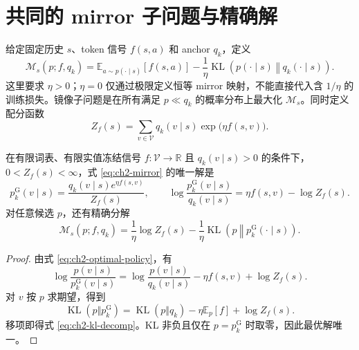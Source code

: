 \section{共同的 mirror 子问题与精确解}
\label{sec:ch2-common}

\begin{definition}
\label{def:ch2-mirror-subproblem}
给定固定历史 $s$、token 信号 $f(s,a)$ 和 anchor $ q_k$，定义
\begin{equation}
\label{eq:ch2-mirror}
\mathcal M_s(p;f, q_k)
=\mathbb E_{a\sim p(\cdot\mid s)}[f(s,a)]
-\frac1\eta\operatorname{KL}\!\left(p(\cdot\mid s)\middle\Vert q_k(\cdot\mid s)\right).
\end{equation}
这里要求 $\eta>0$；$\eta=0$ 仅通过极限定义恒等 mirror 映射，不能直接代入含 $1/\eta$ 的训练损失。镜像子问题是在所有满足 $p\ll q_k$ 的概率分布上最大化 $\mathcal M_s$。同时定义配分函数
\begin{equation}
\label{eq:ch2-mirror-normalizer}
Z_f(s)=\sum_{v\in\mathcal V} q_k(v\mid s)\exp\!\bigl(\eta f(s,v)\bigr).
\end{equation}
\end{definition}

\begin{theorem}
\label{thm:ch2-gibbs}
在有限词表、有限实值冻结信号 $f:\mathcal V\to\mathbb R$ 且 $q_k(v\mid s)>0$ 的条件下，$0<Z_f(s)<\infty$，式 \eqref{eq:ch2-mirror} 的唯一解是
\begin{equation}
\label{eq:ch2-optimal-policy}
 p_k^{\mathrm G}(v\mid s)=\frac{ q_k(v\mid s)e^{\eta f(s,v)}}{Z_f(s)},
\qquad
\log\frac{ p_k^{\mathrm G}(v\mid s)}{ q_k(v\mid s)}
=\eta f(s,v)-\log Z_f(s).
\end{equation}
对任意候选 $p$，还有精确分解
\begin{equation}
\label{eq:ch2-kl-decomp}
\mathcal M_s(p;f, q_k)
=\frac1\eta\log Z_f(s)
-\frac1\eta\operatorname{KL}\!\left(p\middle\Vert p_k^{\mathrm G}(\cdot\mid s)\right).
\end{equation}
\end{theorem}

\begin{proof}
由式 \eqref{eq:ch2-optimal-policy}，有
\begin{equation*}
\log\frac{p(v\mid s)}{ p_k^{\mathrm G}(v\mid s)}
=\log\frac{p(v\mid s)}{ q_k(v\mid s)}-\eta f(s,v)+\log Z_f(s).
\end{equation*}
对 $v$ 按 $p$ 求期望，得到
\begin{equation*}
\operatorname{KL}(p\Vert p_k^{\mathrm G})
=\operatorname{KL}(p\Vert q_k)-\eta\mathbb E_p[f]+\log Z_f(s).
\end{equation*}
移项即得式 \eqref{eq:ch2-kl-decomp}。KL 非负且仅在 $p= p_k^{\mathrm G}$ 时取零，因此最优解唯一。
\end{proof}

